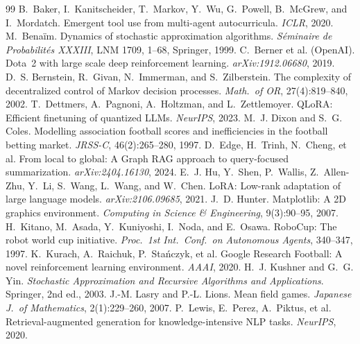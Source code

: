 \documentclass[11pt]{article}
\theoremstyle{definition}
\theoremstyle{remark}
\begin{document}
\begin{thebibliography}{99}
 B.~Baker, I.~Kanitscheider, T.~Markov, Y.~Wu, G.~Powell, B.~McGrew, and I.~Mordatch. Emergent tool use from multi-agent autocurricula. \emph{ICLR}, 2020.
 M.~Bena\"im. Dynamics of stochastic approximation algorithms. \emph{S\'eminaire de Probabilit\'es XXXIII}, LNM 1709, 1--68, Springer, 1999.
 C.~Berner et al. (OpenAI). Dota~2 with large scale deep reinforcement learning. \emph{arXiv:1912.06680}, 2019.
 D.~S. Bernstein, R.~Givan, N.~Immerman, and S.~Zilberstein. The complexity of decentralized control of Markov decision processes. \emph{Math.\ of OR}, 27(4):819--840, 2002.
 T.~Dettmers, A.~Pagnoni, A.~Holtzman, and L.~Zettlemoyer. QLoRA: Efficient finetuning of quantized LLMs. \emph{NeurIPS}, 2023.
 M.~J. Dixon and S.~G. Coles. Modelling association football scores and inefficiencies in the football betting market. \emph{JRSS-C}, 46(2):265--280, 1997.
 D.~Edge, H.~Trinh, N.~Cheng, et al. From local to global: A Graph RAG approach to query-focused summarization. \emph{arXiv:2404.16130}, 2024.
 E.~J. Hu, Y.~Shen, P.~Wallis, Z.~Allen-Zhu, Y.~Li, S.~Wang, L.~Wang, and W.~Chen. LoRA: Low-rank adaptation of large language models. \emph{arXiv:2106.09685}, 2021.
 J.~D. Hunter. Matplotlib: A 2D graphics environment. \emph{Computing in Science \& Engineering}, 9(3):90--95, 2007.
 H.~Kitano, M.~Asada, Y.~Kuniyoshi, I.~Noda, and E.~Osawa. RoboCup: The robot world cup initiative. \emph{Proc.\ 1st Int.\ Conf.\ on Autonomous Agents}, 340--347, 1997.
 K.~Kurach, A.~Raichuk, P.~Sta\'nczyk, et al. Google Research Football: A novel reinforcement learning environment. \emph{AAAI}, 2020.
 H.~J. Kushner and G.~G. Yin. \emph{Stochastic Approximation and Recursive Algorithms and Applications}. Springer, 2nd ed., 2003.
 J.-M. Lasry and P.-L. Lions. Mean field games. \emph{Japanese J.\ of Mathematics}, 2(1):229--260, 2007.
 P.~Lewis, E.~Perez, A.~Piktus, et al. Retrieval-augmented generation for knowledge-intensive NLP tasks. \emph{NeurIPS}, 2020.

\end{thebibliography}
\end{document}
